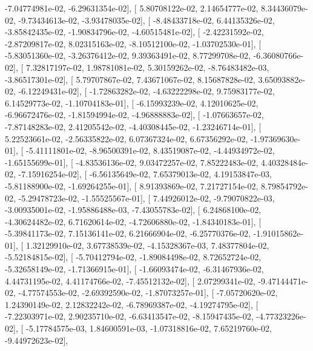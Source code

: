 \documentclass{article}
\begin{document}
         -7.04774981e-02,  -6.29631354e-02],
       [  5.80708122e-02,   2.14654777e-02,   8.34436079e-02,
         -9.73434613e-02,  -3.93478035e-02],
       [ -8.48433718e-02,   6.44135326e-02,  -3.85842435e-02,
         -1.90834796e-02,  -4.60515481e-02],
       [ -2.42231592e-02,  -2.87209817e-02,   8.02315163e-02,
         -8.10512100e-02,  -1.03702530e-01],
       [ -5.83051360e-02,  -3.26376412e-02,   9.39363491e-02,
          8.77299708e-02,  -6.36080766e-02],
       [  7.32817197e-02,   1.98781081e-02,   5.30159262e-02,
         -8.76483482e-03,  -3.86517301e-02],
       [  5.79707867e-02,   7.43671067e-02,   8.15687828e-02,
          3.65093882e-02,  -6.12249431e-02],
       [ -1.72863282e-02,  -4.63222298e-02,   9.75983177e-02,
          6.14529773e-02,  -1.10704183e-01],
       [ -6.15993239e-02,   4.12010625e-02,  -6.96672476e-02,
         -1.81594994e-02,  -4.96888883e-02],
       [ -1.07663657e-02,  -7.87148283e-02,   2.41205542e-02,
         -4.40308445e-02,  -1.23246714e-01],
       [  5.22523661e-02,  -2.56335822e-02,   6.07367324e-02,
          6.67356292e-02,  -1.97369630e-01],
       [ -5.41111801e-02,  -8.96500391e-02,   8.43519087e-02,
         -4.44934972e-02,  -1.65155699e-01],
       [ -4.83536136e-02,   9.03472257e-02,   7.85222483e-02,
          4.40328484e-02,  -7.15916254e-02],
       [ -6.56135649e-02,   7.65379013e-02,   4.19153847e-03,
         -5.81188900e-02,  -1.69264255e-01],
       [  8.91393869e-02,   7.21727154e-02,   8.79854792e-02,
         -5.29478723e-02,  -1.55525567e-01],
       [  7.44926012e-02,  -9.79070822e-03,  -3.00935001e-02,
         -1.95886488e-03,  -7.43055783e-02],
       [  6.24868100e-02,  -4.30624482e-02,   6.71620614e-02,
         -4.72606880e-02,  -1.84340183e-01],
       [ -5.39841173e-02,   7.15136141e-02,   6.21666904e-02,
         -6.25770376e-02,  -1.91015862e-01],
       [  1.32129910e-02,   3.67738539e-02,  -4.15328367e-03,
          7.48377804e-02,  -5.52184815e-02],
       [ -5.70412794e-02,  -1.89084498e-02,   8.72652724e-02,
         -5.32658149e-02,  -1.71366915e-01],
       [ -1.66093474e-02,  -6.31467936e-02,   4.44731195e-02,
          4.41174766e-02,  -7.45512132e-02],
       [  2.07299341e-02,  -9.47144471e-02,  -4.77574553e-02,
         -2.69392590e-02,  -1.87073257e-01],
       [ -7.05720620e-02,   1.24390149e-02,   2.12832242e-02,
         -6.78969387e-02,  -4.19274795e-02],
       [ -7.22303971e-02,   2.90235710e-02,  -6.63413547e-02,
         -8.15947435e-02,  -4.77323226e-02],
       [ -5.17784575e-03,   1.84600591e-03,  -1.07318816e-02,
          7.65219760e-02,  -9.44972623e-02],
\end{document}
